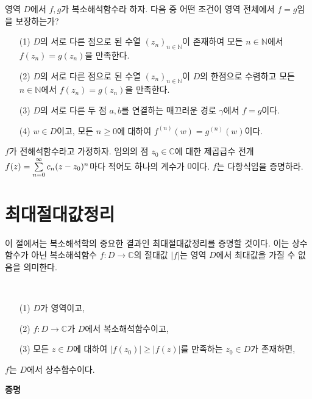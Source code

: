 \begin{salt_exercise} \label{ex-4-24}
영역 $D$에서 $f,g$가 복소해석함수라 하자.
다음 중 어떤 조건이 영역 전체에서 $f=g$임을 보장하는가?
\begin{itemize}
\item[(1)] 
$D$의 서로 다른 점으로 된 수열 $(z_n)_{n\in\mathbb N}$이 존재하여
모든 $n\in \mathbb N$에서 $f(z_n) = g(z_n)$을 만족한다.
\item[(2)] $D$의 서로 다른 점으로 된 수열 $(z_n)_{n\in\mathbb N}$이 $D$의 한점으로 수렴하고
모든 $n\in \mathbb N$에서 $f(z_n) = g(z_n)$을 만족한다.
\item[(3)] $D$의 서로 다른 두 점 $a,b$를 연결하는 매끄러운 경로 $\gamma$에서
$f=g$이다.
\item[(4)]  $w\in D$이고, 모든 $n\ge0$에 대하여 $f^{(n)}(w) = g^{(n)}(w)$이다.
\end{itemize}
\end{salt_exercise}

\begin{salt_exercise} \label{ex-4-25}
$f$가 전해석함수라고 가정하자.
임의의 점 $z_0\in \mathbb C$에 대한 제곱급수 전개
$f(z) = \sum\limits_{n=0}^\infty c_n(z-z_0)^n$마다 적어도 하나의 계수가 $0$이다.
$f$는 다항식임을 증명하라.
\end{salt_exercise}

\section{최대절대값정리} \label{sec-4-6}

이 절에서는 복소해석학의 중요한 결과인  최대절대값정리를 증명할 것이다.
이는 상수함수가 아닌 복소해석함수 $f:D\to\mathbb C$의 절대값 $|f|$는 영역 $D$에서
최대값을 가질 수 없음을 의미한다.

\begin{salt_theorem} [최대절대값정리] \label{thm-4-6}
\
\begin{itemize}
\item[(1)] $D$가 영역이고,
\item[(2)] $f:D\to\mathbb C$가 $D$에서 복소해석함수이고,
\item[(3)] 모든 $z\in D$에 대하여 $|f(z_0)| \ge |f(z)|$를 만족하는 $z_0\in D$가 존재하면,
\end{itemize}
$f$는 $D$에서 상수함수이다.
\end{salt_theorem}

{\bf 증명}

